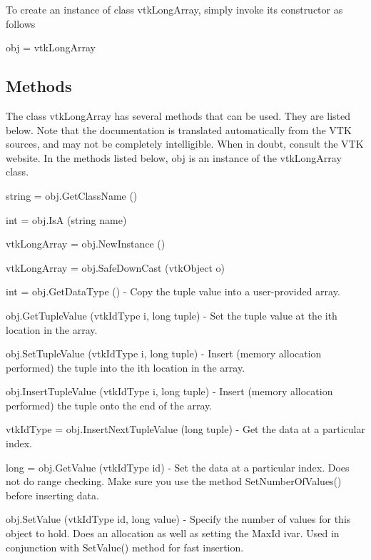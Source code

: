 To create an instance of class vtk\-Long\-Array, simply invoke its constructor as follows \begin{DoxyVerb}  obj = vtkLongArray
\end{DoxyVerb}
 \hypertarget{vtkwidgets_vtkxyplotwidget_Methods}{}\subsection{Methods}\label{vtkwidgets_vtkxyplotwidget_Methods}
The class vtk\-Long\-Array has several methods that can be used. They are listed below. Note that the documentation is translated automatically from the V\-T\-K sources, and may not be completely intelligible. When in doubt, consult the V\-T\-K website. In the methods listed below, {\ttfamily obj} is an instance of the vtk\-Long\-Array class. 
\begin{DoxyItemize}
\item {\ttfamily string = obj.\-Get\-Class\-Name ()}  
\item {\ttfamily int = obj.\-Is\-A (string name)}  
\item {\ttfamily vtk\-Long\-Array = obj.\-New\-Instance ()}  
\item {\ttfamily vtk\-Long\-Array = obj.\-Safe\-Down\-Cast (vtk\-Object o)}  
\item {\ttfamily int = obj.\-Get\-Data\-Type ()} -\/ Copy the tuple value into a user-\/provided array.  
\item {\ttfamily obj.\-Get\-Tuple\-Value (vtk\-Id\-Type i, long tuple)} -\/ Set the tuple value at the ith location in the array.  
\item {\ttfamily obj.\-Set\-Tuple\-Value (vtk\-Id\-Type i, long tuple)} -\/ Insert (memory allocation performed) the tuple into the ith location in the array.  
\item {\ttfamily obj.\-Insert\-Tuple\-Value (vtk\-Id\-Type i, long tuple)} -\/ Insert (memory allocation performed) the tuple onto the end of the array.  
\item {\ttfamily vtk\-Id\-Type = obj.\-Insert\-Next\-Tuple\-Value (long tuple)} -\/ Get the data at a particular index.  
\item {\ttfamily long = obj.\-Get\-Value (vtk\-Id\-Type id)} -\/ Set the data at a particular index. Does not do range checking. Make sure you use the method Set\-Number\-Of\-Values() before inserting data.  
\item {\ttfamily obj.\-Set\-Value (vtk\-Id\-Type id, long value)} -\/ Specify the number of values for this object to hold. Does an allocation as well as setting the Max\-Id ivar. Used in conjunction with Set\-Value() method for fast insertion.  

\end{DoxyItemize}
